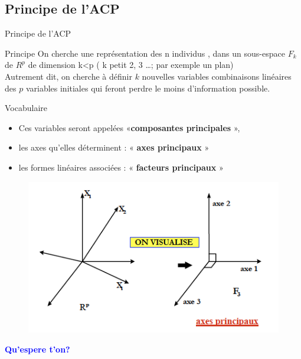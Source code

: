 \documentclass[11pt]{beamer}
\begin{document}
\subsection{Principe de l'ACP}
\begin{frame}{Principe de l'ACP}

\begin{block}{Principe}
On cherche une représentation des n individus , dans un
sous-espace $F_k$ de $R^p$ de dimension k<p ( k petit 2, 3 …; par exemple un plan)\\
Autrement dit, on cherche à définir $k$ nouvelles variables
combinaisons linéaires des $p$ variables initiales qui feront
perdre le moins d’information possible.
\end{block}



\begin{block}{Vocabulaire }
\begin{itemize}
\item Ces variables seront appelées «\textbf{composantes principales }»,
\item les axes qu’elles déterminent : « \textbf{axes principaux} »
\item les formes linéaires associées : « \textbf{facteurs principaux} »
\end{itemize}
\end{block}

\end{frame}


\begin{frame}
\begin{figure}
\includegraphics[scale=0.7]{schema5.png} 
\end{figure}

\textcolor{blue}{\textbf{{\Large Qu'espere t'on?}}}

\end{frame}
\end{document}
